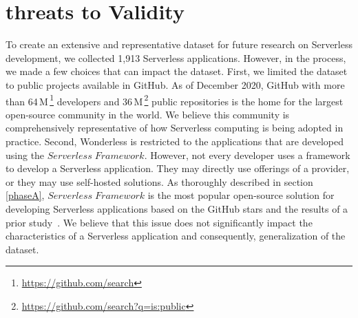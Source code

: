 \section{threats to Validity}
\label{limitations}
To create an extensive and representative dataset for future research 
on Serverless development, we collected 1,913 Serverless applications. 
However, in the process, we made a few choices that can impact the dataset. 
%
First, we limited the dataset to public projects available in GitHub. As of December 2020, 
GitHub with more than 64\,M\,\footnote{\url{https://github.com/search}} 
developers and 36\,M\,\footnote{\url{https://github.com/search?q=is:public}} public 
repositories is the home for the largest open-source community in the world. 
We believe this community is comprehensively representative of how Serverless 
computing is being adopted in practice.
%
Second, Wonderless is restricted to the applications 
that are developed using the $Serverless \; Framework$. 
However, not every developer uses a framework to develop a Serverless application. 
They may directly use offerings of a provider, or they may use self-hosted solutions. 
%
As thoroughly 
described in section\,\ref{phaseA}, $Serverless \; Framework$ is the 
most popular open-source solution for developing Serverless applications 
based on the GitHub stars and the results of a prior study~\cite{kritikos2018review}. 
We believe that this issue does not significantly impact the characteristics of a 
Serverless application and consequently, generalization of the dataset.












